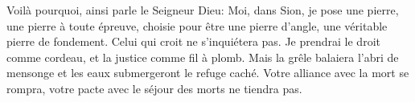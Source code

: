 Voilà pourquoi, ainsi parle le Seigneur Dieu:
	Moi, dans Sion, je pose une pierre, une pierre à toute épreuve,
	choisie pour être une pierre d’angle, une véritable pierre de fondement.
Celui qui croit ne s’inquiétera pas.
Je prendrai le droit comme cordeau,
	et la justice comme fil à plomb.
Mais la grêle balaiera l’abri de mensonge
	et les eaux submergeront le refuge caché.
Votre alliance avec la mort se rompra,
	votre pacte avec le séjour des morts ne tiendra pas.

